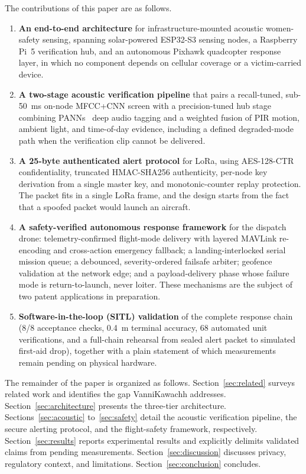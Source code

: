 \documentclass[journal]{IEEEtran}
\begin{document}
The contributions of this paper are as follows.
\begin{enumerate}
\item \textbf{An end-to-end architecture} for infrastructure-mounted acoustic
women-safety sensing, spanning solar-powered ESP32-S3 sensing nodes, a
Raspberry Pi~5 verification hub, and an autonomous Pixhawk quadcopter
response layer, in which no component depends on cellular coverage or a
victim-carried device.
\item \textbf{A two-stage acoustic verification pipeline} that pairs a
recall-tuned, sub-50~ms on-node MFCC+CNN screen with a precision-tuned hub
stage combining PANNs~\cite{kong2020} deep audio tagging and a weighted
fusion of PIR motion, ambient light, and time-of-day evidence, including a
defined degraded-mode path when the verification clip cannot be delivered.
\item \textbf{A 25-byte authenticated alert protocol} for LoRa, using
AES-128-CTR confidentiality, truncated HMAC-SHA256 authenticity, per-node key
derivation from a single master key, and monotonic-counter replay
protection. The packet fits in a single LoRa frame, and the design starts
from the fact that a spoofed packet would launch an aircraft.
\item \textbf{A safety-verified autonomous response framework} for the
dispatch drone: telemetry-confirmed flight-mode delivery with layered MAVLink
re-encoding and cross-action emergency fallback; a landing-interlocked serial
mission queue; a debounced, severity-ordered failsafe arbiter; geofence
validation at the network edge; and a payload-delivery phase whose failure
mode is return-to-launch, never loiter. These mechanisms are the subject of
two patent applications in preparation.
\item \textbf{Software-in-the-loop (SITL) validation} of the complete
response chain (8/8 acceptance checks, 0.4~m terminal accuracy, 68 automated
unit verifications, and a full-chain rehearsal from sealed alert packet to
simulated first-aid drop), together with a plain statement of which
measurements remain pending on physical hardware.
\end{enumerate}

The remainder of the paper is organized as follows.
Section~\ref{sec:related} surveys related work and identifies the gap
VanniKawachh addresses. Section~\ref{sec:architecture} presents the
three-tier architecture. Sections~\ref{sec:acoustic} to~\ref{sec:safety} detail
the acoustic verification pipeline, the secure alerting protocol, and the
flight-safety framework, respectively. Section~\ref{sec:results} reports
experimental results and explicitly delimits validated claims from pending
measurements. Section~\ref{sec:discussion} discusses privacy, regulatory
context, and limitations. Section~\ref{sec:conclusion} concludes.
\end{document}
